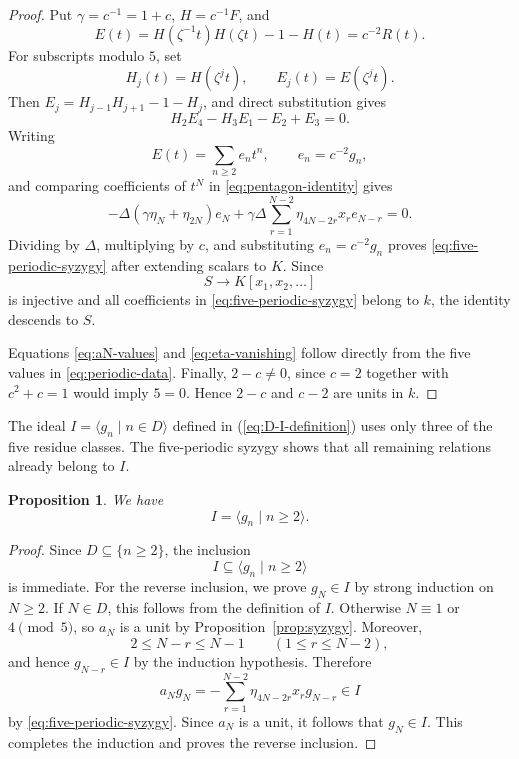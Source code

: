 \documentclass[11pt,reqno]{amsart}
\newtheorem{proposition}[theorem]{Proposition}
\theoremstyle{definition}
\theoremstyle{remark}
\theoremstyle{plain}
\begin{document}
\begin{proof}
Put \(\gamma=c^{-1}=1+c\), \(H=c^{-1}F\), and
\[
  E(t)=H(\zeta^{-1}t)H(\zeta t)-1-H(t)=c^{-2}R(t).
\]
For subscripts modulo \(5\), set
\[
  H_j(t)=H(\zeta^jt),
  \qquad
  E_j(t)=E(\zeta^jt).
\]
Then \(E_j=H_{j-1}H_{j+1}-1-H_j\), and direct substitution gives
\begin{equation}\label{eq:pentagon-identity}
  H_2E_4-H_3E_1-E_2+E_3=0.
\end{equation}
Writing
\[
  E(t)=\sum_{n\geq2}e_nt^n,
  \qquad e_n=c^{-2}g_n,
\]
and comparing coefficients of \(t^N\) in
\eqref{eq:pentagon-identity} gives
\[
  -\Delta(\gamma\eta_N+\eta_{2N})e_N
  +\gamma\Delta\sum_{r=1}^{N-2}
     \eta_{4N-2r}x_re_{N-r}=0.
\]
Dividing by \(\Delta\), multiplying by \(c\), and substituting
\(e_n=c^{-2}g_n\) proves \eqref{eq:five-periodic-syzygy} after
extending scalars to \(K\).  Since
\[
  S\longrightarrow K[x_1,x_2,\ldots]
\]
is injective and all coefficients in
\eqref{eq:five-periodic-syzygy} belong to \(k\), the identity descends
to \(S\).

Equations \eqref{eq:aN-values} and \eqref{eq:eta-vanishing} follow
directly from the five values in \eqref{eq:periodic-data}.  Finally,
\(2-c\neq0\), since \(c=2\) together with \(c^2+c=1\) would imply
\(5=0\).  Hence \(2-c\) and \(c-2\) are units in \(k\).
\end{proof}


The ideal \(I=\langle g_n\mid n\in D\rangle\) defined in (\ref{eq:D-I-definition})  uses only three of the
five residue classes.  The five-periodic syzygy shows that all remaining
relations already belong to \(I\).

\begin{proposition}\label{prop:all-relations}
We have
\[
  I=\langle g_n\mid n\geq2\rangle.
\]
\end{proposition}

\begin{proof}
Since \(D\subseteq\{n\geq2\}\), the inclusion
\[
  I\subseteq\langle g_n\mid n\geq2\rangle
\]
is immediate.  For the reverse inclusion, we prove \(g_N\in I\) by
strong induction on \(N\geq2\).  If \(N\in D\), this follows from the
definition of \(I\).  Otherwise \(N\equiv1\) or \(4\pmod5\), so
\(a_N\) is a unit by Proposition~\ref{prop:syzygy}.  Moreover,
\[
  2\leq N-r\leq N-1
  \qquad (1\leq r\leq N-2),
\]
and hence \(g_{N-r}\in I\) by the induction hypothesis.  Therefore
\[
  a_Ng_N
  =-\sum_{r=1}^{N-2}\eta_{4N-2r}x_rg_{N-r}\in I
\]
by \eqref{eq:five-periodic-syzygy}.  Since \(a_N\) is a unit, it
follows that \(g_N\in I\).  This completes the induction and proves
the reverse inclusion.
\end{proof}
\end{document}

